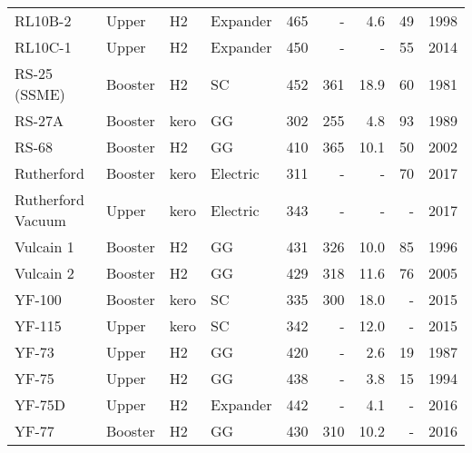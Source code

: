 \begin{tabular}{llllrrrrr}
RL10B-2           &    Upper &    H2 &  Expander &       465 &      - &              4.6 &                  49 &                 1998 \\
RL10C-1           &    Upper &    H2 &  Expander &       450 &      - &              - &                  55 &                 2014 \\
RS-25 (SSME)      &  Booster &    H2 &        SC &       452 &      361 &             18.9 &                  60 &                 1981 \\
RS-27A            &  Booster &  kero &        GG &       302 &      255 &              4.8 &                  93 &                 1989 \\
RS-68             &  Booster &    H2 &        GG &       410 &      365 &             10.1 &                  50 &                 2002 \\
Rutherford        &  Booster &  kero &  Electric &       311 &      - &              - &                  70 &                 2017 \\
Rutherford Vacuum &    Upper &  kero &  Electric &       343 &      - &              - &                 - &                 2017 \\
Vulcain 1         &  Booster &    H2 &        GG &       431 &      326 &             10.0 &                  85 &                 1996 \\
Vulcain 2         &  Booster &    H2 &        GG &       429 &      318 &             11.6 &                  76 &                 2005 \\
YF-100            &  Booster &  kero &        SC &       335 &      300 &             18.0 &                 - &                 2015 \\
YF-115            &    Upper &  kero &        SC &       342 &      - &             12.0 &                 - &                 2015 \\
YF-73             &    Upper &    H2 &        GG &       420 &      - &              2.6 &                  19 &                 1987 \\
YF-75             &    Upper &    H2 &        GG &       438 &      - &              3.8 &                  15 &                 1994 \\
YF-75D            &    Upper &    H2 &  Expander &       442 &      - &              4.1 &                 - &                 2016 \\
YF-77             &  Booster &    H2 &        GG &       430 &      310 &             10.2 &                 - &                 2016 \\
\bottomrule
\end{tabular}
